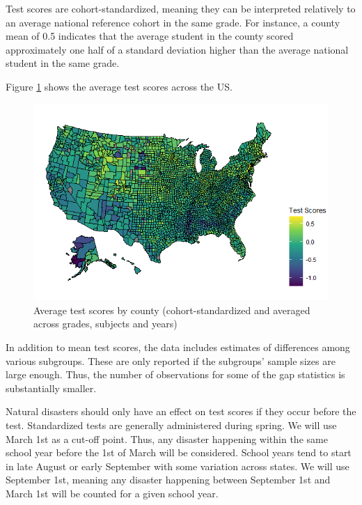 Test scores are cohort-standardized, meaning they can be interpreted relatively to an average national reference cohort in the same grade. For instance, a county mean of 0.5 indicates that the average student in the county scored approximately one half of a standard deviation higher than the average national student in the same grade.

Figure \ref{TestScoresMap} shows the average test scores across the US.


\begin{figure}[!h]
	\centering
	\includegraphics[scale=0.7]{"../Code & Data/TestScoresMap.png"}
	\caption{Average test scores by county (cohort-standardized and averaged across grades, subjects and years)}
	\label{TestScoresMap}
\end{figure}

In addition to mean test scores, the data includes estimates of differences among various subgroups. These are only reported if the subgroups' sample sizes are large enough. Thus, the number of observations for some of the gap statistics is substantially smaller.


Natural disasters should only have an effect on test scores if they occur before the test. Standardized tests are generally administered during spring. We will use March 1st as a cut-off point. Thus, any disaster happening within the same school year before the 1st of March will be considered. School years tend to start in late August or early September with some variation across states. We will use September 1st, meaning any disaster happening between September 1st and March 1st will be counted for a given school year.







